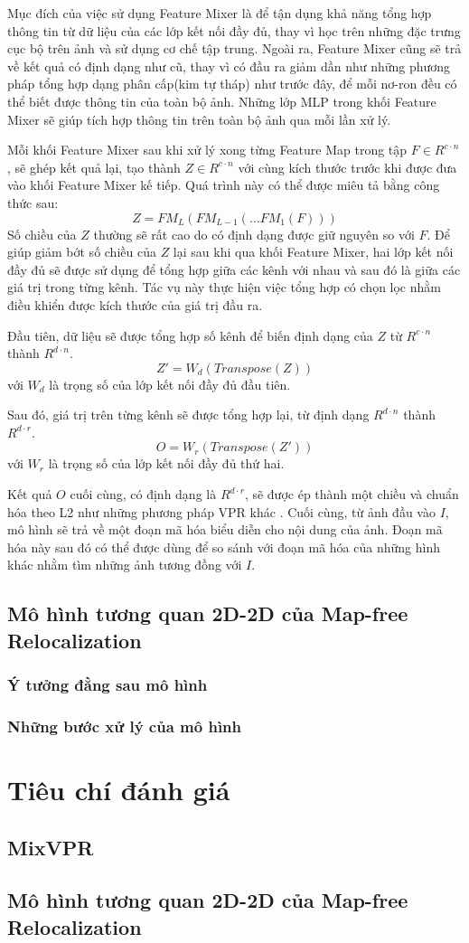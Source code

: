 Mục đích của việc sử dụng Feature Mixer là để tận dụng khả năng tổng hợp thông tin từ dữ liệu của các lớp kết nối đầy đủ, thay vì học trên những đặc trưng cục bộ trên ảnh và sử dụng cơ chế tập trung. Ngoài ra, Feature Mixer cũng sẽ trả về kết quả có định dạng như cũ, thay vì có đầu ra giảm dần như những phương pháp tổng hợp dạng phân cấp(kim tự tháp) như trước đây, để mỗi nơ-ron đều có thể biết được thông tin của toàn bộ ảnh. Những lớp MLP trong khối Feature Mixer sẽ giúp tích hợp thông tin trên toàn bộ ảnh qua mỗi lần xử lý.

Mỗi khối Feature Mixer sau khi xử lý xong từng Feature Map trong tập $F \in R^{c \cdot n}$, sẽ ghép kết quả lại, tạo thành $Z \in R^{c \cdot n}$ với cùng kích thước trước khi được đưa vào khối Feature Mixer kế tiếp. Quá trình này có thể được miêu tả bằng công thức sau:
$$
Z = FM_L(FM_{L-1}(\dots FM_1(F)))
$$
Số chiều của $Z$ thường sẽ rất cao do có định dạng được giữ nguyên so với $F$. Để giúp giảm bớt số chiều của $Z$ lại sau khi qua khối Feature Mixer, hai lớp kết nối đầy đủ sẽ được sử dụng để tổng hợp giữa các kênh với nhau và sau đó là giữa các giá trị trong từng kênh. Tác vụ này thực hiện việc tổng hợp có chọn lọc nhằm điều khiển được kích thước của giá trị đầu ra.

Đầu tiên, dữ liệu sẽ được tổng hợp số kênh để biến định dạng của $Z$ từ $R^{c \cdot n}$ thành $R^{d \cdot n}$.
$$
Z' = W_d(Transpose(Z))
$$
với $W_d$ là trọng số của lớp kết nối đầy đủ đầu tiên.

Sau đó, giá trị trên từng kênh sẽ được tổng hợp lại, từ định dạng $R^{d \cdot n}$ thành $R^{d \cdot r}$.
$$
O = W_r(Transpose(Z'))
$$
với $W_r$ là trọng số của lớp kết nối đầy đủ thứ hai.

Kết quả $O$ cuối cùng, có định dạng là $R^{d \cdot r}$, sẽ được ép thành một chiều và chuẩn hóa theo L2 như những phương pháp VPR khác \cite{arandjelović2016netvlad,berton2022rethinking}. Cuối cùng, từ ảnh đầu vào $I$, mô hình sẽ trả về một đoạn mã hóa biểu diễn cho nội dung của ảnh. Đoạn mã hóa này sau đó có thể được dùng để so sánh với đoạn mã hóa của những hình khác nhằm tìm những ảnh tương đồng với $I$.

\subsection{Mô hình tương quan 2D-2D của Map-free Relocalization \cite{arnold2022mapfree}}
\subsubsection*{Ý tưởng đằng sau mô hình}
\subsubsection*{Những bước xử lý của mô hình}

\section{Tiêu chí đánh giá}
\subsection{MixVPR}
\subsection{Mô hình tương quan 2D-2D của Map-free Relocalization}


